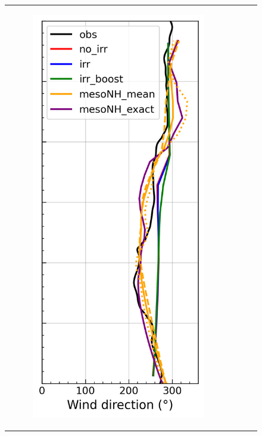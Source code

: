 \begin{figure}[hbtp]
{\begin{tabular}{@{}cccc@{}}
\begin{subfigure}[t]{0.283\textwidth}
            \includegraphics[width=\textwidth]{images/chap6/profiles/profile_elsplans_wind_direction_1507_sensbins.png}

\end{subfigure}
\end{tabular}}
\end{figure}

